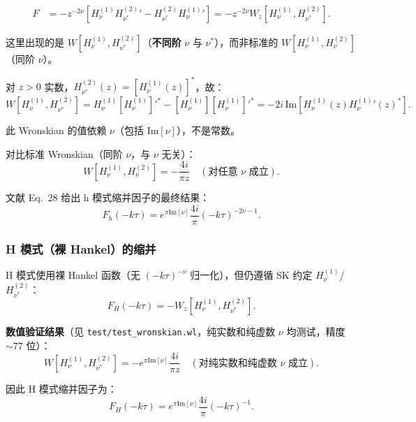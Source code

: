 ﻿\documentclass[a4paper,11pt]{article}
\begin{document}
\begin{align}
  F &=-z^{-2\nu}\left[H_\nu^{(1)}{H_{\nu^*}^{(2)}}'-H_{\nu^*}^{(2)}{H_\nu^{(1)}}'\right]
     =-z^{-2\nu}W_z[H_\nu^{(1)},H_{\nu^*}^{(2)}].
\end{align}

这里出现的是 $W[H_\nu^{(1)}, H_{\nu^*}^{(2)}]$（\textbf{不同阶} $\nu$ 与 $\nu^*$），而非标准的 $W[H_\nu^{(1)}, H_\nu^{(2)}]$（同阶 $\nu$）。

对 $z > 0$ 实数，$H_{\nu^*}^{(2)}(z) = [H_\nu^{(1)}(z)]^*$，故：
\begin{equation}
  W[H_\nu^{(1)}, H_{\nu^*}^{(2)}] = H_\nu^{(1)} [H_\nu^{(1)}]'^* - [H_\nu^{(1)}] [H_\nu^{(1)}]'^* = -2i\,\text{Im}\!\left[H_\nu^{(1)}(z) {H_\nu^{(1)}}'(z)^*\right].
\end{equation}

此 Wronskian 的值依赖 $\nu$（包括 $\text{Im}[\nu]$），不是常数。

对比标准 Wronskian（同阶 $\nu$，与 $\nu$ 无关）：
\begin{equation}
  W[H_\nu^{(1)}, H_\nu^{(2)}] = -\frac{4i}{\pi z} \quad (\text{对任意 } \nu \text{ 成立}).
  \label{Wsameorder}
\end{equation}

文献 Eq.~28 给出 h 模式缩并因子的最终结果：
\begin{equation}
  F_h(-k\tau) = e^{\pi\text{Im}[\nu]} \frac{4i}{\pi} (-k\tau)^{-2\nu-1}.
  \label{Fresult_h}
\end{equation}

\subsubsection{H 模式（裸 Hankel）的缩并}

H 模式使用裸 Hankel 函数（无 $(-k\tau)^{-\nu}$ 归一化），但仍遵循 SK 约定 $H_\nu^{(1)}$/$H_{\nu^*}^{(2)}$：
\begin{equation}
  F_H(-k\tau) = -W_z[H_\nu^{(1)}, H_{\nu^*}^{(2)}].
\end{equation}

\textbf{数值验证结果}（见 \texttt{test/test\_wronskian.wl}，纯实数和纯虚数 $\nu$ 均测试，精度 $\sim 77$ 位）：
\begin{equation}
  \boxed{W[H_\nu^{(1)}, H_{\nu^*}^{(2)}] = -e^{\pi\text{Im}[\nu]} \frac{4i}{\pi z} \quad (\text{对纯实数和纯虚数 } \nu \text{ 成立}).}
  \label{WcrossOrderExact}
\end{equation}

因此 H 模式缩并因子为：
\begin{equation}
  F_H(-k\tau) = e^{\pi\text{Im}[\nu]} \frac{4i}{\pi} (-k\tau)^{-1}.
  \label{Fresult_H}
\end{equation}
\end{document}
